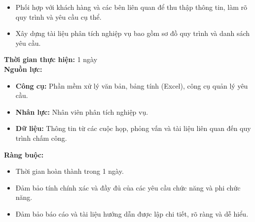 {\begin{minipage}{\textwidth}
\begin{itemize}
        \item Phối hợp với khách hàng và các bên liên quan để thu thập thông tin, làm rõ quy trình và yêu cầu cụ thể.
        \item Xây dựng tài liệu phân tích nghiệp vụ bao gồm sơ đồ quy trình và danh sách yêu cầu.
    \end{itemize}
    \noindent \textbf{Thời gian thực hiện:} 1 ngày \\
    \noindent \textbf{Nguồn lực:}
    \begin{itemize}
        \item \textbf{Công cụ:} Phần mềm xử lý văn bản, bảng tính (Excel), công cụ quản lý yêu cầu.
        \item \textbf{Nhân lực:} Nhân viên phân tích nghiệp vụ.
        \item \textbf{Dữ liệu:} Thông tin từ các cuộc họp, phỏng vấn và tài liệu liên quan đến quy trình chấm công.
    \end{itemize}
    \noindent \textbf{Ràng buộc:}
    \begin{itemize}
        \item Thời gian hoàn thành trong 1 ngày.
        \item Đảm bảo tính chính xác và đầy đủ của các yêu cầu chức năng và phi chức năng.
        \item Đảm bảo báo cáo và tài liệu hướng dẫn được lập chi tiết, rõ ràng và dễ hiểu.
    \end{itemize}
    \end{minipage}
}
\newpage %
